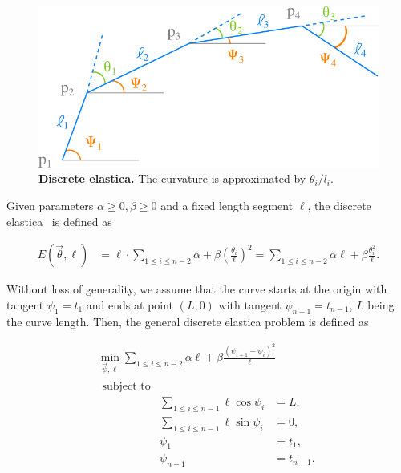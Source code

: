 \begin{figure}
\center
\includegraphics[scale=0.6]{figures/chapter3/bruckstein/polygonal-line.png}
\caption{\textbf{Discrete elastica.} The curvature is approximated by $\theta_i/l_i$.}
\label{ch3:fig:bruckstein-polygonal-line}
\end{figure}

Given parameters $\alpha \geq 0,\beta \geq 0$ and a fixed length segment $\ell$, the discrete elastica~\cite{bruckstein01discrete} is defined as

\begin{align}
	E(\vec{\theta},\ell) &= \ell \cdot \sum_{1 \leq i \leq n-2}{ \alpha + \beta \left(\frac{\theta_i}{\ell}\right)^2} = \sum_{1 \leq i \leq n-2}{ \alpha \ell + \beta \frac{\theta_i^2}{\ell}}.
	\label{ch3:eq:discrete-elastica}
\end{align}

Without loss of generality, we assume that the curve starts at the origin with tangent $\psi_1=t_1$ and ends at point $(L,0)$ with tangent $\psi_{n-1}=t_{n-1}$, $L$ being the curve length. Then, the general discrete elastica problem is defined as

\begin{align*}
	\min_{\vec{\psi},\ell}{ \sum_{1 \leq i \leq n-2 }{ \alpha \ell + \beta \frac{ (\psi_{i+1} - \psi_{i} )^2}{\ell}}}\\
	\begin{array}{rrl}
		\text{subject to}&& \\
		&\displaystyle \sum_{1 \leq i \leq n-1}{\ell\cos \psi_i} &= L, \\[1em]
		&\displaystyle \sum_{1 \leq i \leq n-1}{\ell\sin \psi_i} &= 0, \\[1em]
		&\displaystyle \psi_1 &= t_1, \\[1em]
		&\displaystyle \psi_{n-1} &= t_{n-1}.
	\end{array}
\end{align*}

